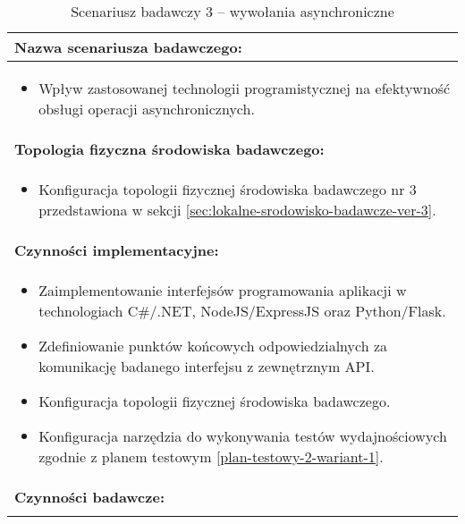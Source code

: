 \setlength{\LTcapwidth}{\textwidth}
\setlength\LTleft{0pt}
\setlength\LTright{0pt}
\begin{longtable}[c]{|llll|}
    \caption{Scenariusz badawczy 3 -- wywołania asynchroniczne}
    \label{tab:research-scenario-3}                                                  \\ \hline
    \multicolumn{4}{|l|}{\textbf{Nazwa scenariusza badawczego:}}                     \\ \hline
    \multicolumn{4}{|p{\linewidth}|}{
        \begin{itemize}[label={}]
            \item Wpływ zastosowanej technologii programistycznej na efektywność obsługi operacji asynchronicznych.
          \end{itemize}
    } \\ \hline
    \multicolumn{4}{|l|}{\textbf{Topologia fizyczna środowiska badawczego:}}         \\ \hline
    \multicolumn{4}{|p{\linewidth}|}{
        \begin{itemize}[label={}]
            \item Konfiguracja topologii fizycznej środowiska badawczego nr 3 przedstawiona w sekcji \ref{sec:lokalne-srodowisko-badawcze-ver-3}.
          \end{itemize}
    }\\ \hline
    \multicolumn{4}{|l|}{\textbf{Czynności implementacyjne:}}                        \\ \hline
    \multicolumn{4}{|p{\linewidth}|}{
        \begin{itemize}
            \item Zaimplementowanie interfejsów programowania aplikacji w technologiach C\#/.NET, NodeJS/ExpressJS oraz Python/Flask.
            \item Zdefiniowanie punktów końcowych odpowiedzialnych za komunikację badanego interfejsu z zewnętrznym API.
            \item Konfiguracja topologii fizycznej środowiska badawczego.
            \item Konfiguracja narzędzia do wykonywania testów wydajnościowych zgodnie z planem testowym \ref{plan-testowy-2-wariant-1}.
        \end{itemize}}                                                           \\ \hline
    \multicolumn{4}{|l|}{\textbf{Czynności badawcze:}}                               \\ \hline
    \multicolumn{4}{|p{\linewidth}|}{
}
\end{longtable}
